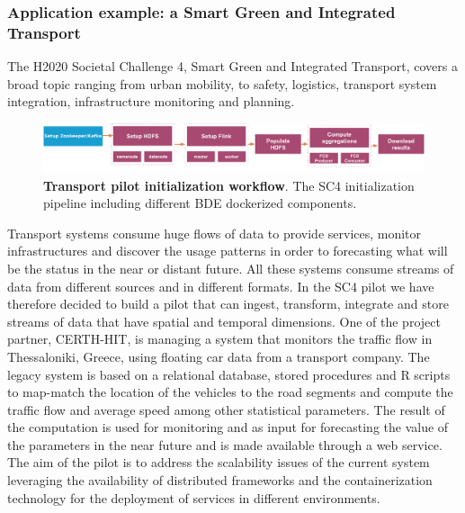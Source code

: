 \subsubsection{Application example: a Smart Green and Integrated Transport}
The H2020 Societal Challenge 4, Smart Green and Integrated Transport, covers a broad topic ranging from urban mobility, to safety, logistics, transport system integration, infrastructure monitoring and planning.
\begin{figure}[h]
\centering
	\includegraphics[width=\textwidth]{images/7_implemenation_and_usecases/SC4_Arch.pdf}
	\caption{\textbf{Transport pilot initialization workflow}.
	The SC4 initialization pipeline including different BDE dockerized components.
	}
	\label{fig:SC4-pipeline}
\end{figure}
Transport systems consume huge flows of data to provide services, monitor infrastructures and discover the usage patterns in order to forecasting what will be the status in the near or distant future. 
All these systems consume streams of data from different sources and in different formats. 
In the SC4 pilot we have therefore decided to build a pilot that can ingest, transform, integrate and store streams of data that have spatial and temporal dimensions. 
One of the project  partner, CERTH-HIT, is managing a system that monitors the traffic flow in Thessaloniki, Greece, using floating car data from a transport company. 
The legacy system is based on a relational database, stored procedures and R scripts to map-match the location of the vehicles to the road segments and compute the traffic flow and average speed among other statistical parameters. 
The result of the computation is used for monitoring and as input for forecasting the value of the parameters in the near future and is made available through a web service. 
The aim of the pilot is to address the scalability issues of the current system leveraging the availability of distributed frameworks and the containerization technology for the deployment of services in different environments.

